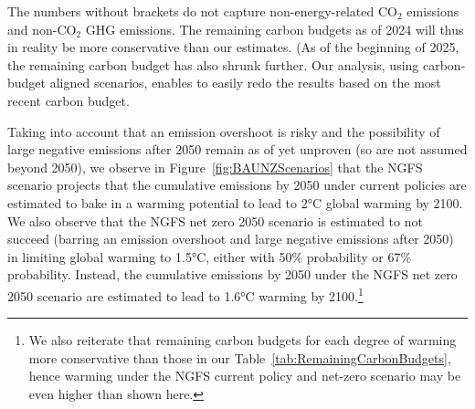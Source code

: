 \documentclass[11pt,a4paper,table,xcdraw]{article}
\begin{document}
\begin{table}[H]
\begin{tablenotes}
\item The numbers without brackets do not capture non-energy-related CO$_2$ emissions and non-CO$_2$ GHG emissions. The remaining carbon budgets as of 2024 will thus in reality be more conservative than our estimates. (As of the beginning of 2025, the remaining carbon budget has also shrunk further. Our analysis, using carbon-budget aligned scenarios, enables to easily redo the results based on the most recent carbon budget.
\end{tablenotes}
\end{table}

Taking into account that an emission overshoot is risky and the possibility of large negative emissions after 2050 remain as of yet unproven (so are not assumed beyond 2050), we observe in Figure~\ref{fig:BAUNZScenarios} that the NGFS scenario projects that the cumulative emissions by 2050 under current policies are estimated to bake in a warming potential to lead to 2°C global warming by 2100. We also observe that the NGFS net zero 2050 scenario is estimated to not succeed (barring an emission overshoot and large negative emissions after 2050) in limiting global warming to 1.5°C, either with 50\% probability or 67\% probability. Instead, the cumulative emissions by 2050 under the NGFS net zero 2050 scenario are estimated to lead to 1.6°C warming by 2100.\footnote{We also reiterate that remaining carbon budgets for each degree of warming more conservative than those in our Table~\ref{tab:RemainingCarbonBudgets}, hence warming under the NGFS current policy and net-zero scenario may be even higher than shown here.}
\end{document}
